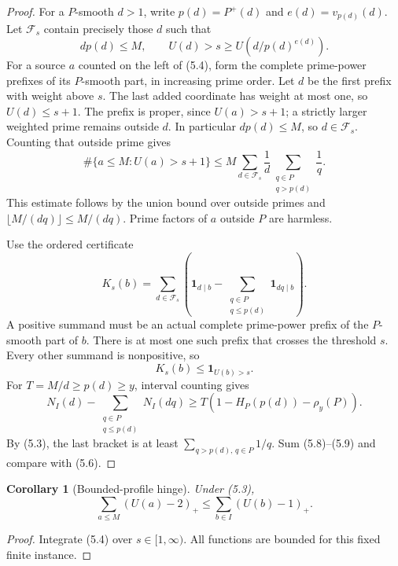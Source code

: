 \documentclass[11pt,a4paper]{article}
\newtheorem{corollary}[theorem]{Corollary}
\theoremstyle{remark}
\newcommand{\pos}[1]{\left(#1\right)_+}
\newcommand{\ind}{\mathbf 1}
\begin{document}
\begin{proof}
For a \(P\)-smooth \(d>1\), write \(p(d)=P^+(d)\) and
\(e(d)=v_{p(d)}(d)\). Let \(\mathcal F_s\) contain precisely those \(d\)
such that
\[
 dp(d)\le M,\qquad
 U(d)>s\ge U(d/p(d)^{e(d)}).
 \tag{5.5}
\]
For a source \(a\) counted on the left of (5.4), form the complete
prime-power prefixes of its \(P\)-smooth part, in increasing prime
order. Let \(d\) be the first prefix with weight above \(s\).
The last added coordinate has weight at most one, so \(U(d)\le s+1\).
The prefix is proper, since \(U(a)>s+1\); a strictly larger weighted
prime remains outside \(d\). In particular \(dp(d)\le M\), so
\(d\in\mathcal F_s\). Counting that outside prime gives
\[
 \#\{a\le M:U(a)>s+1\}
 \le
 M\sum_{d\in\mathcal F_s}\frac1d
       \sum_{\substack{q\in P\\q>p(d)}}\frac1q.
 \tag{5.6}
\]
This estimate follows by the union bound over outside primes and
\(\lfloor M/(dq)\rfloor\le M/(dq)\). Prime factors of \(a\) outside
\(P\) are harmless.

Use the ordered certificate
\[
 K_s(b)=\sum_{d\in\mathcal F_s}
 \left(\ind_{d\mid b}-
       \sum_{\substack{q\in P\\q\le p(d)}}\ind_{dq\mid b}\right).
 \tag{5.7}
\]
A positive summand must be an actual complete prime-power prefix of
the \(P\)-smooth part of \(b\). There is at most one such prefix that
crosses the threshold \(s\). Every other summand is nonpositive, so
\[
 K_s(b)\le\ind_{U(b)>s}.
 \tag{5.8}
\]
For \(T=M/d\ge p(d)\ge y\), interval counting gives
\[
 N_I(d)-\sum_{\substack{q\in P\\q\le p(d)}}N_I(dq)
 \ge
 T\left(1-H_P(p(d))-\rho_y(P)\right).
 \tag{5.9}
\]
By (5.3), the last bracket is at least
\(\sum_{q>p(d),\,q\in P}1/q\). Sum (5.8)--(5.9) and compare with
(5.6).
\end{proof}

\begin{corollary}[Bounded-profile hinge]
Under (5.3),
\[
 \sum_{a\le M}\pos{U(a)-2}
 \le \sum_{b\in I}\pos{U(b)-1}.
 \tag{5.10}
\]
\end{corollary}
\begin{proof}
Integrate (5.4) over \(s\in[1,\infty)\). All functions are bounded
for this fixed finite instance.
\end{proof}
\end{document}
